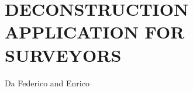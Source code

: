\section{\uppercase{Deconstruction Application for surveyors}}
\label{sec:introduction}

\noindent Da Federico and Enrico

\noindent\lipsum[2-4]


